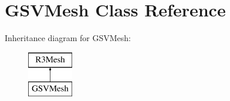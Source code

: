 \hypertarget{class_g_s_v_mesh}{}\section{G\+S\+V\+Mesh Class Reference}
\label{class_g_s_v_mesh}
Inheritance diagram for G\+S\+V\+Mesh\+:\begin{figure}[H]
\begin{center}
\leavevmode
\includegraphics[height=2.000000cm]{class_g_s_v_mesh}
\end{center}
\end{figure}
